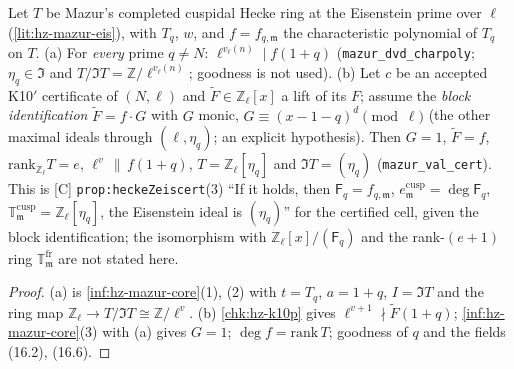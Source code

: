 \begin{theorem}\label{chk:hz-mazur-val}
  \leanok
  Let $T$ be Mazur's completed cuspidal Hecke ring at the Eisenstein prime over $\ell$ (\ref{lit:hz-mazur-eis}), with $T_q$, $w$, and
  $f=f_{q,\mathfrak m}$ the characteristic polynomial of $T_q$ on $T$. (a) For \emph{every} prime $q\ne N$: $\ell^{v_\ell(n)}\mid f(1+q)$
  (\texttt{mazur\_dvd\_charpoly}; $\eta_q\in\mathfrak I$ and $T/\mathfrak IT=\mathbb Z/\ell^{v_\ell(n)}$; goodness is not used). (b) Let $c$ be an accepted
  K10$'$ certificate of $(N,\ell)$ and $\tilde F\in\mathbb Z_\ell[x]$ a lift of its $F$; assume the \emph{block identification}
  $\tilde F=f\cdot G$ with $G$ monic, $G\equiv(x-1-q)^d\pmod\ell$ (the other maximal ideals through $(\ell,\eta_q)$; an explicit hypothesis).
  Then $G=1$, $\tilde F=f$, $\mathrm{rank}_{\mathbb Z_\ell}T=e$, $\ell^v\,\|\,f(1+q)$, $T=\mathbb Z_\ell[\eta_q]$ and $\mathfrak IT=(\eta_q)$
  (\texttt{mazur\_val\_cert}). This is [C] \texttt{prop:heckeZeiscert}(3) ``If it holds, then $\mathsf F_q=f_{q,\mathfrak m}$,
  $e^{\mathrm{cusp}}_{\mathfrak m}=\deg\mathsf F_q$, $\mathbb T^{\mathrm{cusp}}_{\mathfrak m}=\mathbb Z_\ell[\eta_q]$, the Eisenstein ideal is $(\eta_q)$'' for the
  certified cell, given the block identification; the isomorphism with $\mathbb Z_\ell[x]/(\mathsf F_q)$ and the rank-$(e+1)$ ring
  $\mathbb T^{\mathrm{fr}}_{\mathfrak m}$ are not stated here.
\end{theorem}
\begin{proof}
  \leanok
  (a) is \ref{inf:hz-mazur-core}(1), (2) with $t=T_q$, $a=1+q$, $I=\mathfrak IT$ and the ring map $\mathbb Z_\ell\to T/\mathfrak IT\cong\mathbb Z/\ell^v$.
  (b) \ref{chk:hz-k10p} gives $\ell^{v+1}\nmid\tilde F(1+q)$; \ref{inf:hz-mazur-core}(3) with (a) gives $G=1$; $\deg f=\mathrm{rank}\,T$; goodness of
  $q$ and the fields (16.2), (16.6).
\end{proof}

